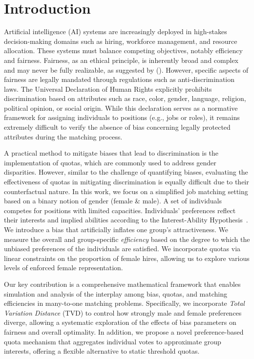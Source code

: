 \documentclass[letterpaper]{article}
\newcommand{\citet}[1]{\citeauthor{#1} (\citeyear{#1})}
\begin{document}
\section{Introduction}
Artificial intelligence (AI) systems are increasingly deployed in high-stakes decision-making domains such as hiring, workforce management, and resource allocation. These systems must balance competing objectives, notably efficiency and fairness. Fairness, as an ethical principle, is inherently broad and complex and may never be fully realizable, as suggested by \citet{Peterson_Hamrouni_2022}. However, specific aspects of fairness are legally mandated through regulations such as anti-discrimination laws. The Universal Declaration of Human Rights \cite{udhr1948} explicitly prohibits discrimination based on attributes such as race, color, gender, language, religion, political opinion, or social origin. While this declaration serves as a normative framework for assigning individuals to positions (e.g., jobs or roles), it remains extremely difficult to verify the absence of bias concerning legally protected attributes during the matching process.

A practical method to mitigate biases that lead to discrimination is the implementation of quotas, which are commonly used to address gender disparities. However, similar to the challenge of quantifying biases, evaluating the effectiveness of quotas in mitigating discrimination is equally difficult due to their counterfactual nature. In this work, we focus on a simplified job matching setting based on a binary notion of gender (female \& male). A set of individuals competes for positions with limited capacities. Individuals' preferences reflect their interests and implied abilities according to the Interest-Ability Hypothesis~\cite{jintelligence10030043}. We introduce a bias that artificially inflates one group's attractiveness. We measure the overall and group-specific \textit{efficiency} based on the degree to which the unbiased preferences of the individuals are satisfied. We incorporate quotas via linear constraints on the proportion of female hires, allowing us to explore various levels of enforced female representation. 

Our key contribution is a comprehensive mathematical framework that enables simulation and analysis of the interplay among bias, quotas, and matching efficiencies in many-to-one matching problems. Specifically, we incorporate \textit{Total Variation Distance} (TVD) to control how strongly male and female preferences diverge, allowing a systematic exploration of the effects of bias parameters on fairness and overall optimality. In addition, we propose a novel preference-based quota mechanism that aggregates individual votes to approximate group interests, offering a flexible alternative to static threshold quotas.
\end{document}

